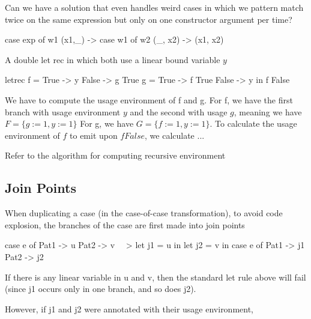 \documentclass[a4paper, draft]{article}
\begin{document}

Can we have a solution that even handles weird cases in which we pattern match
twice on the same expression but only on one constructor argument per time?
\begin{code}
case exp of w1
    (x1,_) -> case w1 of w2
                (_, x2) -> (x1, x2)
\end{code}

A double let rec in which both use a linear bound variable $y$
\begin{code}
letrec f = \case
        True  -> y
        False -> g True
       g = \case
        True -> f True
        False -> y
    in f False
\end{code}

We have to compute the usage environment of f and g.
For f, we have the first branch with usage environment $y$ and the second with
usage $g$, meaning we have $F = \{g := 1, y := 1\}$
For g, we have $G = \{f := 1, y := 1\}$. To calculate the usage environment of
$f$ to emit upon $f False$, we calculate ...

Refer to the algorithm for computing recursive environment


\subsection{Join Points}

When duplicating a case (in the case-of-case transformation), to avoid code
explosion, the branches of the case are first made into join points

\begin{code}
case e of
  Pat1 -> u
  Pat2 -> v
~~>
let j1 = u in
let j2 = v in
case e of
  Pat1 -> j1
  Pat2 -> j2
\end{code}

If there is any linear variable in u and v, then the standard
let rule above will fail (since j1 occurs only in one branch, and
so does j2).

However, if j1 and j2 were annotated with their usage environment,
\end{document}
